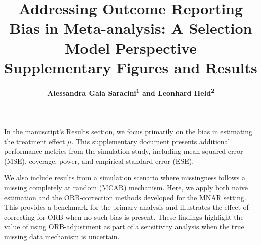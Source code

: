 \documentclass{article}\usepackage[]{graphicx}\usepackage[]{xcolor}
\date{}
\begin{document}
\title{ \huge{\textbf{Addressing Outcome Reporting Bias in Meta-analysis: A Selection Model Perspective}}\\[0.5em]
\large{Supplementary Figures and Results}
}

\author{\textbf{Alessandra Gaia Saracini\textsuperscript{1} and Leonhard Held\textsuperscript{2}}}


\maketitle


In the manuscript’s Results section, we focus primarily on the bias in estimating the treatment effect $\mu$. This supplementary document presents additional performance metrics from the simulation study, including mean squared error (MSE), coverage, power, and empirical standard error (ESE).

\bigskip

We also include results from a simulation scenario where missingness follows a missing completely at random (MCAR) mechanism. Here, we apply both naive estimation and the ORB-correction methods developed for the MNAR setting. This provides a benchmark for the primary analysis and illustrates the effect of correcting for ORB when no such bias is present. These findings highlight the value of using ORB-adjustment as part of a sensitivity analysis when the true missing data mechanism is uncertain.
\end{document}
